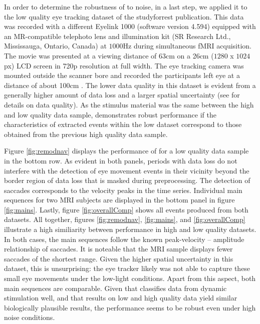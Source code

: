 In order to determine the robustness of \remodnav to noise, in a last step, we
applied it to the low quality eye tracking dataset of the studyforrest
publication. This data was recorded with a different Eyelink 1000 (software
version 4.594) equipped with an MR-compatible telephoto lens and illumination
kit (SR Research Ltd., Mississauga, Ontario, Canada) at $1000$Hz during
simultaneous fMRI acquisition. The movie was presented at a viewing distance of
$63$cm on a 26cm ($1280$ x $1024$px) LCD screen in 720p resolution at full
width. The eye tracking camera was mounted outside the scanner bore and
recorded the participants left eye at a distance of about 100cm
\citep{Hanke2016}.  The lower data quality in this dataset is evident from a
generally higher amount of data loss and a larger spatial uncertainty (see
\citet{Hanke2016} for details on data quality). As the stimulus material was
the same between the high and low quality data sample, \remodnav demonstrates
robust performance if the characteristics of extracted events within the low
dataset correspond to those obtained from the previous high quality data
sample.


Figure \ref{fig:remodnav} displays the performance of \remodnav for a low
quality data sample in the bottom row.  As evident in both panels, periods with
data loss do not interfere with the detection of eye movement events in their
vicinity beyond the border region of data loss that is masked during
preprocessing. The detection of saccades corresponds to the velocity peaks in
the time series. Individual main sequences for two MRI subjects are displayed
in the bottom panel in figure \ref{fig:mains}. Lastly, figure
\ref{fig:overallComp} shows all events produced from both datasets. All
together, figures \ref{fig:remodnav}, \ref{fig:mains}, and
\ref{fig:overallComp} illustrate a high similiarity between performance in high
and low quality datasets. In both cases, the main sequences follow the known
peak-velocity -- amplitude relationship of saccades. It is noteable that the
MRI sample displays fewer saccades of the shortest range. Given the higher
spatial uncertainty in this dataset, this is unsurprising: the eye tracker
likely was not able to capture these small eye movements under the low-light
conditions. Apart from this aspect, both main sequences are comparable. Given
that \remodnav classifies data from dynamic stimulation well, and that results
on low and high quality data yield similar biologically plausible results, the
performance seems to be robust even under high noise conditions.

